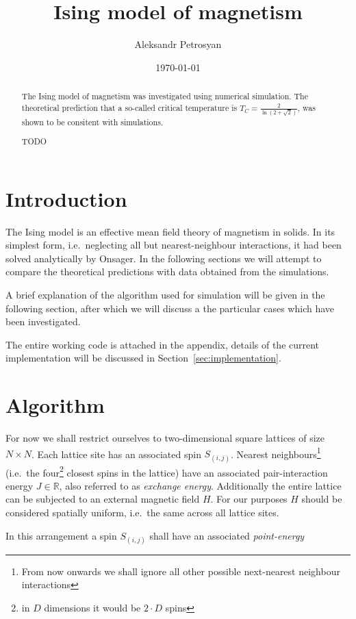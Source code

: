 \documentclass[11pt]{article}
\author{Aleksandr Petrosyan}
\date{\today}
\title{Ising model of magnetism}
\begin{document}
\maketitle


\begin{abstract}
The Ising model of magnetism was investigated using numerical simulation. The theoretical prediction that a so-called critical temperature is \(T_C = \frac{2}{\ln(2 + \sqrt{2})}\),  was shown to be consitent with simulations. 

TODO
\end{abstract}


\section{Introduction}\label{sec:intro}
The Ising model is an effective mean field theory of magnetism in solids. In its simplest form, i.e.~neglecting all but nearest-neighbour interactions, it had been solved analytically by Onsager. In the following sections we will attempt to compare the theoretical predictions with data obtained from the simulations. 

A brief explanation of the algorithm used for simulation will be given in the following section, after which we will discuss a the particular cases which have been investigated. 

The entire working code is attached in the appendix, details of the current implementation will be discussed in Section~\ref{sec:implementation}. 

\section{Algorithm}\label{sec:algorithm}

For now we shall restrict ourselves to two-dimensional square lattices of size \(N \times N\). Each lattice site has an associated spin \(S_{(i, j)}\). Nearest neighbours\footnote{From now onwards we shall ignore all other possible next-nearest neighbour interactions} (i.e.~the four\footnote{in \(D\) dimensions it would be \(2 \cdot D\) spins} closest spins in the lattice) have an associated pair-interaction energy \(J \in \mathbb{R}\), also referred to as \emph{exchange energy}. Additionally the entire lattice can be subjected to an external magnetic field \(H\). For our purposes \(H\) should be considered spatially uniform, i.e.~the same across all lattice sites. 

In this arrangement a spin \( S_{(i, j)}\) shall have an associated \emph{point-energy}
\end{document}
